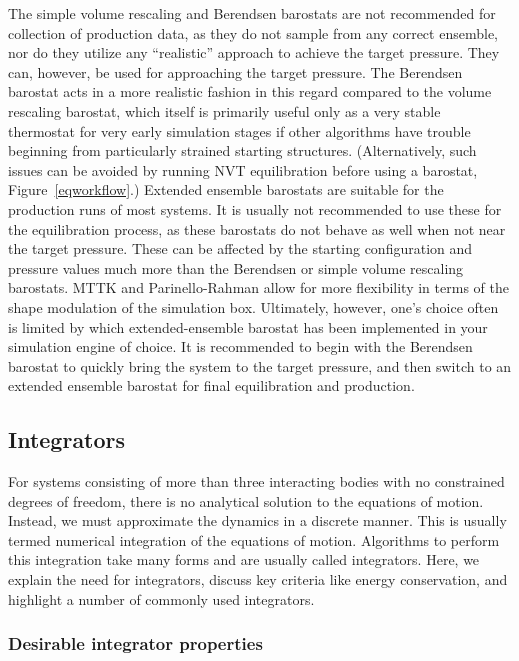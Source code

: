 \documentclass[9pt,bestpractices]{livecoms}
\begin{document}
The simple volume rescaling and Berendsen barostats are not recommended for collection of production data, as they do not sample from any correct ensemble, nor do they utilize any ``realistic'' approach to achieve the target pressure.
They can, however,  be used for approaching the target pressure.
The Berendsen barostat acts in a more realistic fashion in this regard compared to the volume rescaling barostat, which itself is primarily useful only as a very stable thermostat for very early simulation stages if other algorithms have trouble beginning from particularly strained starting structures. 
(Alternatively, such issues can be avoided by running NVT equilibration before using a barostat, Figure~\ref{eqworkflow}.)
Extended ensemble barostats are suitable for the production runs of most systems.
It is usually not recommended to use these for the equilibration process, as these barostats do not behave as well when not near the target pressure.
These can be affected by the starting configuration and pressure values much more than the Berendsen or simple volume rescaling barostats.
MTTK and Parinello-Rahman allow for more flexibility in terms of the shape modulation of the simulation box.
Ultimately, however, one's choice often is limited by which extended-ensemble barostat has been implemented in your simulation engine of choice.
It is recommended to begin with the Berendsen barostat to quickly bring the system to the target pressure, and then switch to an extended ensemble barostat for final equilibration and production.

\subsection{Integrators}
\label{sec:integrators}

For systems consisting of more than three interacting bodies with no constrained degrees of freedom, there is no analytical solution to the equations of motion.
Instead, we must approximate the dynamics in a discrete manner.
This is usually termed numerical integration of the equations of motion. 
Algorithms to perform this integration take many forms and are usually called integrators.
Here, we explain the need for integrators, discuss key criteria like energy conservation, and highlight a number of commonly used integrators.

\subsubsection{Desirable integrator properties}
\end{document}
